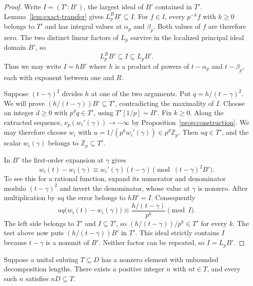 \begin{proof}
    Write $I = (T' : B')$, the largest ideal of $B'$ contained in $T'$.
    Lemma~\ref{lem:exact-transfer} gives $L_p^R B' \subseteq I$.
    For $f \in I$, every $p^{-k} f$ with $k \ge 0$ belongs to $T'$ and has integral values at $\alpha_p$ and $\beta_p$.
    Both values of $f$ are therefore zero.
    The two distinct linear factors of $L_p$ survive in the localized principal ideal domain $B'$, so
    \[
        L_p^R B' \subseteq I \subseteq L_p B'.
    \]
    Thus we may write $I = h B'$ where $h$ is a product of powers of $t - \alpha_p$ and $t - \beta_p$, each with exponent between one and $R$.

    Suppose $(t - \gamma)^2$ divides $h$ at one of the two arguments.
    Put $q = h/(t - \gamma)^2$.
    We will prove $(h/(t - \gamma)) B' \subseteq T'$, contradicting the maximality of $I$.
    Choose an integer $d \ge 0$ with $p^d q \in T'$, using $T'[1/p] = B'$.
    Fix $k \ge 0$.
    Along the extracted sequence, $\nu_p(w_i'(\gamma)) \to -\infty$ by Proposition~\ref{prop:construction}.
    We may therefore choose $w_i$ with $u = 1/(p^k w_i'(\gamma)) \in p^d\mathbb{Z}_p$.
    Then $uq \in T'$, and the scalar $w_i(\gamma)$ belongs to $\mathbb{Z}_p \subseteq T'$.

    In $B'$ the first-order expansion at $\gamma$ gives
    \[
        w_i(t) - w_i(\gamma) \equiv w_i'(\gamma)(t - \gamma)
        \pmod{(t - \gamma)^2 B'}.
    \]
    To see this for a rational function, expand its numerator and denominator modulo $(t - \gamma)^2$ and invert the denominator, whose value at $\gamma$ is nonzero.
    After multiplication by $uq$ the error belongs to $h B' = I$.
    Consequently
    \[
        uq\bigl(w_i(t) - w_i(\gamma)\bigr)
        \equiv \frac{h/(t - \gamma)}{p^k} \pmod{I}.
    \]
    The left side belongs to $T'$ and $I \subseteq T'$, so $(h/(t - \gamma))/p^k \in T'$ for every $k$.
    The test above now puts $(h/(t - \gamma))B'$ in $T'$.
    This ideal strictly contains $I$ because $t - \gamma$ is a nonunit of $B'$.
    Neither factor can be repeated, so $I = L_p B'$.
\end{proof}

\begin{theorem}
    \label{thm:conductor}
    Suppose a unital subring $T \subseteq D$ has a nonzero element with unbounded decomposition lengths.
    There exists a positive integer $n$ with $nt \in T$, and every such $n$ satisfies $nD \subseteq T$.
\end{theorem}

